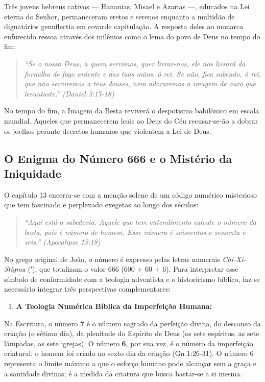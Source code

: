 Três jovens hebreus cativos — Hananias, Misael e Azarias —, educados na Lei eterna do Senhor, permaneceram eretos e serenos enquanto a multidão de dignatários genuflectia em covarde capitulação. A resposta deles ao monarca enfurecido ressoa através dos milênios como o lema do povo de Deus no tempo do fim:


\begin{quote}
\itshape \textit{``Se o nosso Deus, a quem servimos, quer livrar-nos, ele nos livrará da fornalha de fogo ardente e das tuas mãos, ó rei. Se não, fica sabendo, ó rei, que não serviremos a teus deuses, nem adoraremos a imagem de ouro que levantaste.''} (Daniel 3:17-18)
\end{quote}


No tempo do fim, a Imagem da Besta reviverá o despotismo babilônico em escala mundial. Aqueles que permanecerem leais ao Deus do Céu recusar-se-ão a dobrar os joelhos perante decretos humanos que violentem a Lei de Deus.



\subsection{O Enigma do Número 666 e o Mistério da Iniquidade}


O capítulo 13 encerra-se com a menção solene de um código numérico misterioso que tem fascinado e perplexado exegetas ao longo dos séculos:


\begin{quote}
\itshape \textit{``Aqui está a sabedoria. Aquele que tem entendimento calcule o número da besta, pois é número de homem. Esse número é seiscentos e sessenta e seis.''} (Apocalipse 13:18)
\end{quote}


No grego original de João, o número é expresso pelas letras numerais \textit{Chi-Xi-Stigma} (ʹ), que totalizam o valor 666 (600 + 60 + 6). Para interpretar esse símbolo de conformidade com a teologia adventista e o historicismo bíblico, faz-se necessário integrar três perspectivas complementares:

\begin{enumerate}
  \item \textbf{A Teologia Numérica Bíblica da Imperfeição Humana:}
\end{enumerate}

Na Escritura, o número \textbf{7} é o número sagrado da perfeição divina, do descanso da criação (o sétimo dia), da plenitude do Espírito de Deus (os sete espíritos, as sete lâmpadas, as sete igrejas). O número \textbf{6}, por sua vez, é o número da imperfeição criatural: o homem foi criado no sexto dia da criação (Gn 1:26-31). O número 6 representa o limite máximo a que o esforço humano pode alcançar sem a graça e a santidade divinas; é a medida da criatura que busca bastar-se a si mesma.

